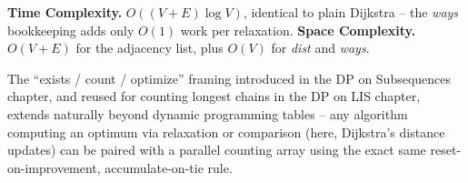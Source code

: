 \begin{complexitybox}
\textbf{Time Complexity.} $O((V+E)\log V)$, identical to plain
Dijkstra -- the \textit{ways} bookkeeping adds only $O(1)$ work per
relaxation.
\textbf{Space Complexity.} $O(V+E)$ for the adjacency list, plus
$O(V)$ for \textit{dist} and \textit{ways}.
\end{complexitybox}

\begin{takeawaybox}
The ``exists / count / optimize'' framing introduced in the DP on
Subsequences chapter, and reused for counting longest chains in the DP
on LIS chapter, extends naturally beyond dynamic programming tables --
any algorithm computing an optimum via relaxation or comparison (here,
Dijkstra's distance updates) can be paired with a parallel counting
array using the exact same reset-on-improvement,
accumulate-on-tie rule.
\end{takeawaybox}
